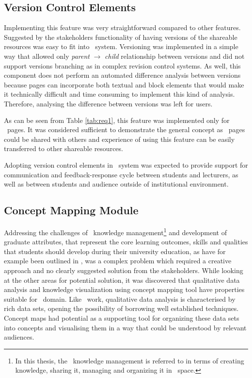\subsection{Version Control Elements}
\label{sec:version}
Implementing this feature was very straightforward compared to other features.
Suggested by the stakeholders functionality of having versions of the shareable
resources was easy to fit into \ep~system. Versioning was implemented in a
simple way that allowed only \textit{parent} $\to$ \textit{child} relationship
between versions and did not support versions branching as in complex revision
control systems. As well, this component does not perform an automated
difference analysis between versions because pages can incorporate both textual
and block elements that would make it technically difficult and time consuming to
implement this kind of analysis. Therefore, analysing the difference between
versions was left for users.
 
As can be seen from Table \ref{tab:req1}, this feature was implemented only for
\ep~pages. It was considered sufficient to demonstrate the general concept as
\ep~pages could be shared with others and experience of using this feature can
be easily transferred to other shareable resources.

Adopting version control elements in \ep~system was expected to provide support
for communication and feedback-response cycle between students and lecturers, as
well as between students and audience outside of institutional environment.

\subsection{Concept Mapping Module}
\label{sec:mapping}
Addressing the challenges of \ep~knowledge management\footnote{In this thesis,
the \ep~knowledge management is referred to in terms of creating knowledge,
sharing it, managing and organizing it in \ep~space.} and development of
graduate attributes, that represent the core learning outcomes, skills and
qualities that students should develop during their university education, as
have for example been outlined in \citet{Hughes2010}, was a complex problem
which required a creative approach and no clearly suggested solution from the
stakeholders. While looking at the other areas for potential solution, it was
discovered that qualitative data analysis and knowledge visualization using
concept mapping tool have properties suitable for \ep~domain. Like \ep~work,
qualitative data analysis is characterised by rich data sets, opening the
possibility of borrowing well established techniques. Concept maps had potential
as a supporting tool for organizing these data sets into concepts and
visualising them in a way that could be understood by relevant audiences.

